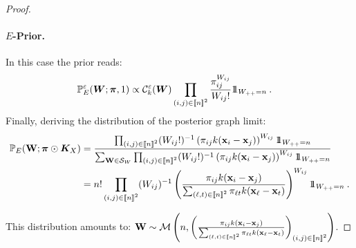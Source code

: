 \begin{proof}
\paragraph{$E$-Prior.}
In this case the prior reads:
\begin{align*}
    \mathbb{P}_{E}^{\varepsilon}(\bm{W}; \bm{\pi}, 1) &\propto \mathcal{C}_{k}^{\varepsilon}(\bm{W}) \prod_{(i,j) \in {[\![n]\!]}^2} \frac{\pi_{ij}^{W_{ij}}}{W_{ij}!} 1\!\!1_{W_{++} = n} \:.
\end{align*}
Finally, deriving the distribution of the posterior graph limit:
\begin{align*}
    \mathbb{P}_{E}(\W ;\bm{\pi} \odot \bm{K}_{X}) &= \frac{\prod_{(i,j) \in \integ{n}^2}  (W_{ij}!)^{-1}\left(\pi_{ij} k(\mathbf{x}_i - \mathbf{x}_j)\right)^{W_{ij}} \ind_{W_{++} = n}}{\sum_{\W \in \mathcal{S}_{W}} \prod_{(i,j) \in \integ{n}^2} (W_{ij}!)^{-1} \left(\pi_{ij} k(\mathbf{x}_i - \mathbf{x}_j)\right)^{W_{ij}} \ind_{W_{++} = n}} \\
    &= n! \prod_{(i,j) \in \integ{n}^2} (W_{ij})^{-1} \left(\frac{\pi_{ij} k(\mathbf{x}_i - \mathbf{x}_j)}{\sum_{(\ell,t) \in \integ{n}^2} \pi_{\ell t} k(\mathbf{x}_{\ell} - \mathbf{x}_t)}\right)^{W_{ij}} \ind_{W_{++} = n} \:.
\end{align*}

This distribution amounts to: $\mathbf{W} \sim \mathcal{M}\left(n, \left(\frac{\pi_{ij} k(\mathbf{x}_i - \mathbf{x}_j)}{\sum_{(\ell,t) \in {[\![n]\!]}^2} \pi_{\ell t} k(\mathbf{x}_{\ell} - \mathbf{x}_t)}\right)_{(i,j) \in {[\![n]\!]}^2}\right)$.
\end{proof}